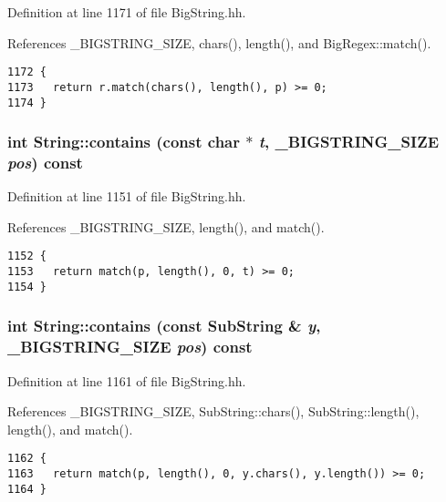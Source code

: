 Definition at line 1171 of file Big\-String.hh.

References \_\-BIGSTRING\_\-SIZE, chars(), length(), and Big\-Regex::match().



\footnotesize\begin{verbatim}1172 {
1173   return r.match(chars(), length(), p) >= 0;
1174 }
\end{verbatim}\normalsize 
{}
\subsubsection{\setlength{\rightskip}{0pt plus 5cm}int String::contains (const char $\ast$ {\em t}, {\bf \_\-BIGSTRING\_\-SIZE} {\em pos}) const\hspace{0.3cm}{\tt  [inline]}}\label{classString_a40}




Definition at line 1151 of file Big\-String.hh.

References \_\-BIGSTRING\_\-SIZE, length(), and match().



\footnotesize\begin{verbatim}1152 {
1153   return match(p, length(), 0, t) >= 0;
1154 }
\end{verbatim}\normalsize 
{}
\subsubsection{\setlength{\rightskip}{0pt plus 5cm}int String::contains (const {\bf Sub\-String} \& {\em y}, {\bf \_\-BIGSTRING\_\-SIZE} {\em pos}) const\hspace{0.3cm}{\tt  [inline]}}\label{classString_a39}




Definition at line 1161 of file Big\-String.hh.

References \_\-BIGSTRING\_\-SIZE, Sub\-String::chars(), Sub\-String::length(), length(), and match().



\footnotesize\begin{verbatim}1162 {
1163   return match(p, length(), 0, y.chars(), y.length()) >= 0;
1164 }
\end{verbatim}\normalsize 
{}
